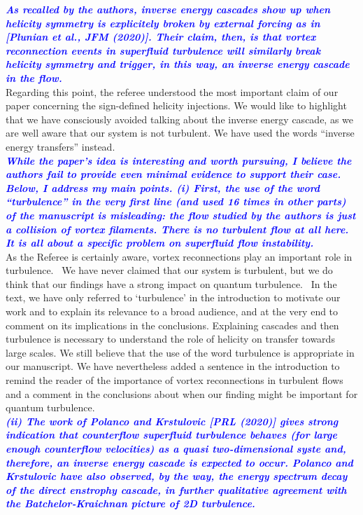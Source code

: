 \documentclass[a4paper,10pt]{article}
\def\blue#1{\textcolor{blue}{#1}}
\def\refcomment#1{\textbf{\blue{\emph{#1}}}\\}
\begin{document}
\refcomment{As recalled by the authors, inverse energy cascades show up when helicity symmetry is explicitely broken by external forcing as in [Plunian et al., JFM (2020)]. Their claim, then, is that vortex reconnection events in superfluid turbulence will similarly break helicity symmetry and trigger, in this way, an inverse energy cascade in the flow.}

Regarding this point, the referee understood the most important claim of our paper concerning the sign-defined helicity injections. We would like to highlight that we have consciously avoided talking about the inverse energy cascade, as we are well aware that our system is not turbulent. We have used the words “inverse energy transfers” instead.\\

\refcomment{While the paper’s idea is interesting and worth pursuing, I believe the authors fail to provide even minimal evidence to support their case. Below, I address my main points.
(i) First, the use of the word “turbulence” in the very first line (and used 16 times in other parts) of the manuscript is misleading: the flow studied by the authors is just a collision of vortex filaments. There is no turbulent flow at all here. It is all about a specific problem on superfluid flow instability.}

As the Referee is certainly aware, vortex reconnections play an important role in turbulence.  We have never claimed that our system is turbulent, but we do think that our findings have a strong impact on quantum turbulence.  In the text, we have only referred to `turbulence' in the introduction to motivate our work and to explain its relevance to a broad audience, and at the very end to comment on its implications in the conclusions. Explaining cascades and then turbulence is necessary to understand the role of helicity on transfer towards large scales. We still believe that the use of the word turbulence is appropriate in our manuscript. We have nevertheless added a sentence in the introduction to remind the reader of the importance of vortex reconnections in turbulent flows and a comment in the conclusions about when our finding might be important for quantum turbulence. \\

\refcomment{(ii) The work of Polanco and Krstulovic [PRL (2020)] gives strong indication that counterflow superfluid turbulence behaves (for large enough counterflow velocities) as a quasi two-dimensional syste and, therefore, an inverse energy cascade is expected to occur. Polanco and Krstulovic have also observed, by the way, the energy spectrum decay of the direct enstrophy cascade, in further qualitative agreement with the Batchelor-Kraichnan picture of 2D turbulence.}
\end{document}

